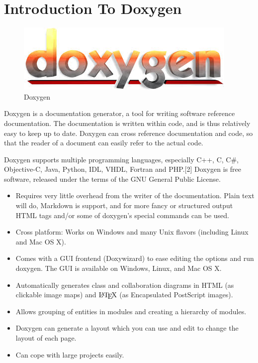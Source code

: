 \section{Introduction To Doxygen}


\begin{figure}[h!]
	\centering \includegraphics[scale=1]{input/images/doxygen.jpeg}
	\caption{Doxygen}
\end{figure}
\noindent Doxygen is a documentation generator, a tool for writing software reference
documentation. The documentation is written within code, and is thus
relatively easy to keep up to date. Doxygen can cross reference
documentation and code, so that the reader of a document can easily
refer to the actual code.

Doxygen supports multiple programming languages, especially C++, C,
C\#, Objective-C, Java, Python, IDL, VHDL, Fortran and PHP.[2] Doxygen
 is free software, released under the terms of the GNU General Public
 License.\\


\begin{itemize}
\item Requires very little overhead from the writer of the documentation. 
Plain text will do, Markdown is support, and for more fancy or structured 
output HTML tags and/or some of doxygen's special commands can be used.
\item Cross platform: Works on Windows and many Unix flavors (including 
Linux and Mac OS X).
\item Comes with a GUI frontend (Doxywizard) to ease editing the options 
and run doxygen. The GUI is available on Windows, Linux, and Mac OS X.
\item Automatically generates class and collaboration diagrams in HTML 
(as clickable image maps) and $\mbox{\LaTeX}$ (as Encapsulated PostScript 
images).
\item Allows grouping of entities in modules and creating a hierarchy 
of modules.
\item Doxygen can generate a layout which you can use and edit to change 
the layout of each page.
\item Can cope with large projects easily.

\end{itemize}
